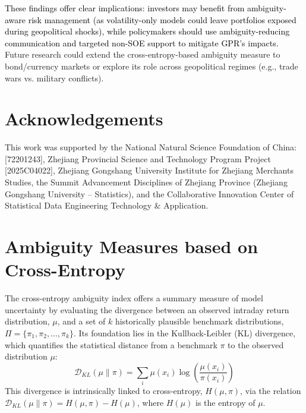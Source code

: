\documentclass[preprint,12pt,authoryear]{elsarticle}
\begin{document}
\textcolor{black}{These findings offer clear implications: investors may benefit from ambiguity-aware risk management (as volatility-only models could leave portfolios exposed during geopolitical shocks), while policymakers should use ambiguity-reducing communication and targeted non-SOE support to mitigate GPR's impacts.} Future research could extend the cross-entropy-based ambiguity measure to bond/currency markets or explore its role across geopolitical regimes (e.g., trade wars vs. military conflicts).




\clearpage
\section*{Acknowledgements}
This work was supported by the National Natural Science Foundation of China: [72201243], Zhejiang Provincial Science and Technology Program Project [2025C04022], Zhejiang Gongshang University Institute for Zhejiang Merchants Studies, the Summit Advancement Disciplines of Zhejiang Province (Zhejiang Gongshang University -- Statistics), and the Collaborative Innovation Center of Statistical Data Engineering Technology \& Application.

\appendix

\section{Ambiguity Measures based on Cross-Entropy}
The cross-entropy ambiguity index offers a summary measure of model uncertainty by evaluating the divergence between an observed intraday return distribution, $\mu$, and a set of $k$ historically plausible benchmark distributions, $\Pi = \{\pi_1, \pi_2, \dots, \pi_k\}$. Its foundation lies in the Kullback-Leibler (KL) divergence, which quantifies the statistical distance from a benchmark $\pi$ to the observed distribution $\mu$:
\begin{equation}
    \mathcal{D}_{KL}(\mu \| \pi) = \sum_{i} \mu(x_i) \log\left(\frac{\mu(x_i)}{\pi(x_i)}\right)
\end{equation}
This divergence is intrinsically linked to cross-entropy, $H(\mu, \pi)$, via the relation $\mathcal{D}_{KL}(\mu \| \pi) = H(\mu, \pi) - H(\mu)$, where $H(\mu)$ is the entropy of $\mu$.
\end{document}
